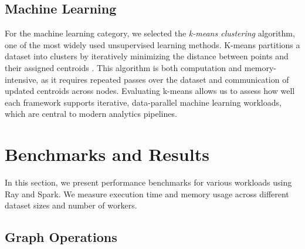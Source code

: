 \documentclass[conference]{IEEEtran}
\begin{document}
\subsection{Machine Learning}

For the machine learning category, we selected the \textit{k-means
clustering} algorithm, one of the most widely used unsupervised
learning methods. K-means partitions a dataset into clusters by
iteratively minimizing the distance between points and their assigned
centroids \cite{kmeans}. This algorithm is both computation and
memory-intensive, as it requires repeated passes over the dataset
and communication of updated centroids across nodes. Evaluating
k-means allows us to assess how well each framework supports
iterative, data-parallel machine learning workloads, which are
central to modern analytics pipelines.  

\section{Benchmarks and Results}

In this section, we present performance benchmarks for various
workloads using Ray and Spark. We measure execution time and memory
usage across different dataset sizes and number of workers.

\subsection{Graph Operations}



\begin{figure}[H]
\centering
{}
\end{figure}
\end{document}
